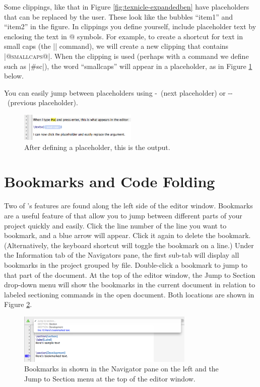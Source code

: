 Some clippings, like that in Figure \ref{fig:texnicle-expandedben} have placeholders that can be replaced by the user. These look like the bubbles ``item1'' and ``item2'' in the figure. In clippings you define yourself, include placeholder text by enclosing the text in @ symbols. For example, to create a shortcut for text in small caps (the |\smallcaps| command), we will create a new clipping that contains |\textsc{@smallcaps@}|. When the clipping is used (perhaps with a command we define such as |#sc|), the word ``smallcaps'' will appear in a placeholder, as in Figure \ref{fig:texnicle-customcliptag} below.

You can easily jump between placeholders using \cmdkey-\returnkey\ (next placeholder) or \shiftkey-\cmdkey-\returnkey\ (previous placeholder).

\begin{figure}[htbp]
\centering
\includegraphics[width=0.5\textwidth]{TeXnicle-Images/texnicle-customcliptag.png}
\caption{After defining a placeholder, this is the output.}
\label{fig:texnicle-customcliptag}
\end{figure}

\section{Bookmarks and Code Folding}
\label{reference.bookmarksfolding}
Two of \texnicle's features are found along the left side of the editor window. Bookmarks are a useful feature of \texnicle that allow you to jump between different parts of your project quickly and easily. Click the line number of the line you want to bookmark, and a blue arrow will appear. Click it again to delete the bookmark. (Alternatively, the keyboard shortcut  will toggle the bookmark on a line.) Under the Information tab of the Navigators pane, the first sub-tab will display all bookmarks in the project grouped by file. Double-click a bookmark to jump to that part of the document. At the top of the editor window, the Jump to Section drop-down menu will show the bookmarks in the current document in relation to labeled sectioning commands in the open document. Both locations are shown in Figure \ref{fig:texnicle-bookmarks}.
\begin{figure}[htbp]
\centering
\includegraphics[width=0.75\textwidth]{TeXnicle-Images/texnicle-bookmarks.png}
\caption{Bookmarks in \texnicle shown in the Navigator pane on the left and the Jump to Section menu at the top of the editor window.}
\label{fig:texnicle-bookmarks}
\end{figure}


